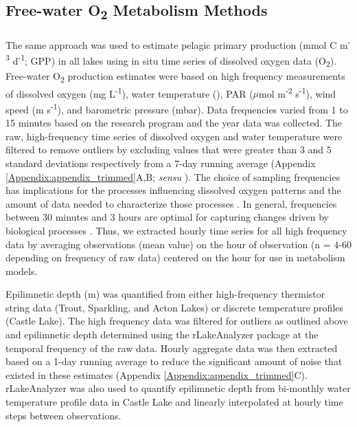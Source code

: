 \documentclass[12pt, oneside]{article}
\begin{document}
\subsection*{Free-water O\textsubscript{2} Metabolism Methods}

The same approach was used to estimate pelagic primary production (mmol C m\textsuperscript{-3} d\textsuperscript{-1}; GPP) in all lakes using in situ time series of dissolved oxygen data (O\textsubscript{2}). Free-water O\textsubscript{2} production estimates were based on high frequency measurements of dissolved oxygen (mg L\textsuperscript{-1}), water temperature (\textcelsius{}), PAR ($\mu$mol m\textsuperscript{-2} s\textsuperscript{-1}), wind speed (m s\textsuperscript{-1}), and barometric pressure (mbar). Data frequencies varied from 1 to 15 minutes based on the research program and the year data was collected. The raw, high-frequency time series of dissolved oxygen and water temperature were filtered to remove outliers by excluding values that were greater than 3 and 5 standard deviations respectively from a 7-day running average (Appendix \ref{Appendix:appendix_trimmed}A,B; \emph{sensu} \citealt{phillips_timevarying_2020}). The choice of sampling frequencies has implications for the processes influencing dissolved oxygen patterns and the amount of data needed to characterize those processes \citep{staehr_lake_2010}. In general, frequencies between 30 minutes and 3 hours are optimal for capturing changes driven by biological processes \citep{staehr_lake_2010}. Thus, we extracted hourly time series for all high frequency data by averaging observations (mean value) on the hour of observation (n = 4-60 depending on frequency of raw data) centered on the hour \citep{phillips_timevarying_2020} for use in metabolism models.

Epilimnetic depth (m) was quantified from either high-frequency thermistor string data (Trout, Sparkling, and Acton Lakes) or discrete temperature profiles (Castle Lake). The high frequency data was filtered for outliers as outlined above and epilimnetic depth determined using the rLakeAnalyzer package \citep{read_derivation_2011, winslow_rlakeanalyzer_2019} at the temporal frequency of the raw data. Hourly aggregate data was then extracted based on a 1-day running average to reduce the significant amount of noise that existed in these estimates (Appendix \ref{Appendix:appendix_trimmed}C). rLakeAnalyzer was also used to quantify epilimnetic depth from bi-monthly water temperature profile data in Castle Lake and linearly interpolated at hourly time steps between observations.
\end{document}
